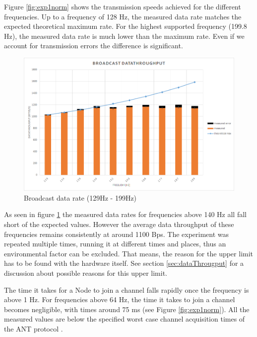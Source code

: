 \begin{description}
	Figure \ref{fig:exp1norm} shows the transmission speeds achieved for the different frequencies. Up to a frequency of 128 Hz, the measured data rate matches the expected theoretical maximum rate. For the highest supported frequency (199.8 Hz), the measured data rate is much lower than the maximum rate. Even if we account for transmission errors the difference is significant. 
	\begin{figure}[h]
		\centering
		\includegraphics[scale=0.5]{content/images/exp1_detail.png}
		\caption{Broadcast data rate (129Hz - 199Hz)}\label{fig:exp1between}
	\end{figure}
	As seen in figure \ref{fig:exp1between} the measured data rates for frequencies above 140 Hz all fall short of the expected values. However the average data throughput of these frequencies remains consistently at around 1100 Bps. The experiment was repeated multiple times, running it at different times and places, thus an environmental factor can be excluded. That means, the reason for the upper limit has to be found with the hardware itself. See section \ref{sec:dataThrougput} for a discussion about possible reasons for this upper limit.
	
	The time it takes for a Node to join a channel falls rapidly once the frequency is above 1 Hz. For frequencies above 64 Hz, the time it takes to join a channel becomes negligible, with times around 75 ms (see Figure \ref{fig:exp1norm}). All the measured values are below the specified worst case channel acquisition times of the ANT protocol \cite{AntChan}.
	

\end{description}
